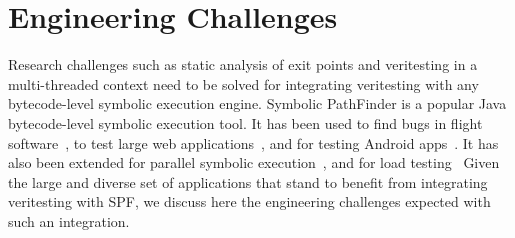 \section{Engineering Challenges}
Research challenges such as static analysis of exit points and veritesting in a multi-threaded context need to be solved for integrating veritesting with any bytecode-level symbolic execution engine.
%
Symbolic PathFinder is a popular Java bytecode-level symbolic execution tool.
%
It has been used to find bugs in flight software~\cite{pasareanu2008}, to test large web applications~\cite{fujitsu}, and for testing Android apps~\cite{android_spf}.
%
It has also been extended for parallel symbolic execution~\cite{parallel}, and for load testing~\cite{load_testing_spf}
%
Given the large and diverse set of applications that stand to benefit from integrating veritesting with SPF, we discuss here the engineering challenges expected with such an integration.

